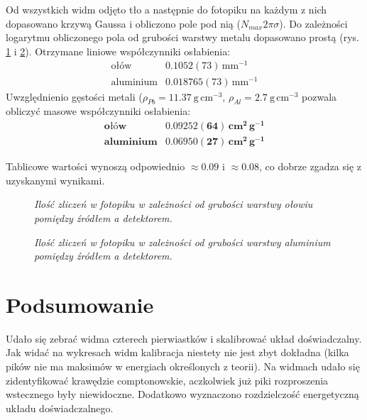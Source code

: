 \documentclass[10pt, twocolumn]{article}
\begin{document}
Od wszystkich widm odjęto tło a następnie do fotopiku na każdym z nich dopasowano krzywą Gaussa i obliczono pole pod nią ($N_{max}2 \pi \sigma$). Do zależności logarytmu obliczonego pola od grubości warstwy metalu dopasowano prostą (rys. \ref{ab_pb} i \ref{ab_al}). Otrzymane liniowe współczynniki osłabienia:
\begin{equation*}
  \begin{array}{ll}
    \text{ołów} & 0.1052(73)\,\text{mm}^{-1} \\
    \text{aluminium} & 0.018765(73)\,\text{mm}^{-1}
  \end{array}
\end{equation*}
Uwzględnienio gęstości metali ($\rho_{Pb} = 11.37\ \mathrm{g\,cm}^{-3}$, $\rho_{Al} = 2.7\ \mathrm{g\,cm}^{-3}$ pozwala obliczyć masowe współczynniki osłabienia:
\begin{equation*}
  \begin{array}{ll}
    \textbf{ołów} & \mathbf{0.09252(64)\,cm^2\,g^{-1}} \\
    \textbf{aluminium} & \mathbf{0.06950(27)\,cm^2\,g^{-1}}
  \end{array}
\end{equation*}

Tablicowe wartości \cite{prac} wynoszą odpowiednio $\approx 0.09$ i $\approx 0.08$, co dobrze zgadza się z uzyskanymi wynikami.

\begin{figure}
  \caption{\em Ilość zliczeń w fotopiku w zależności od grubości warstwy ołowiu pomiędzy źródłem a detektorem.}
  \label{ab_pb}
\end{figure}

\begin{figure}
  \caption{\em Ilość zliczeń w fotopiku w zależności od grubości warstwy aluminium pomiędzy źródłem a detektorem.}
  \label{ab_al}
\end{figure}


\section*{Podsumowanie}
Udało się zebrać widma czterech pierwiastków i skalibrować układ doświadczalny. Jak widać na wykresach widm kalibracja niestety nie jest zbyt dokładna (kilka pików nie ma maksimów w energiach określonych z teorii). Na widmach udało się zidentyfikować krawędzie comptonowskie, aczkolwiek już piki rozproszenia wstecznego były niewidoczne. Dodatkowo wyznaczono rozdzielczość energetyczną układu doświadczalnego.
\end{document}
